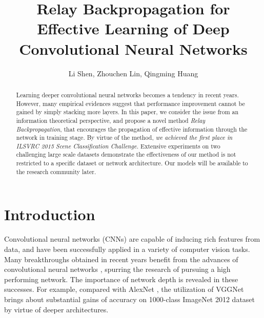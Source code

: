 \documentclass[runningheads]{llncs}
\begin{document}
\pagestyle{headings}
\mainmatter

\title{Relay Backpropagation for Effective Learning of Deep Convolutional Neural Networks} 

\titlerunning{ }

\authorrunning{ }

\author{Li Shen, Zhouchen Lin, Qingming Huang}


\maketitle

\begin{abstract}
Learning deeper convolutional neural networks becomes a tendency in recent years. However, many empirical evidences suggest that performance improvement cannot be gained by simply stacking more layers. In this paper, we consider the issue from an information theoretical perspective, and propose a novel method {\it Relay Backpropagation}, that encourages the propagation of  effective information through the network in training stage. By virtue of the method, {\it we achieved the first place in ILSVRC 2015 Scene Classification Challenge.} Extensive experiments on two challenging large scale datasets demonstrate the effectiveness of
our method is not restricted to a specific dataset or network architecture. Our models will be available to the research community later.

\end{abstract}


\section{Introduction}

Convolutional neural networks (CNNs) are capable of inducing rich features from data, and have been successfully applied in a variety of computer vision tasks. Many breakthroughs obtained in recent years benefit from the advances of convolutional neural networks \cite{krizhevsky_nips2012,girshick_cvpr2014,taigman_cvpr2014,karpathy_cvpr2014}, spurring the research of pursuing a high performing network. The importance of network depth is revealed in these successes. For example, compared with AlexNet \cite{krizhevsky_nips2012}, the utilization of VGGNet \cite{simonyan_iclr2015} brings about substantial gains of accuracy on 1000-class ImageNet 2012 dataset by virtue of deeper architectures.
\end{document}
